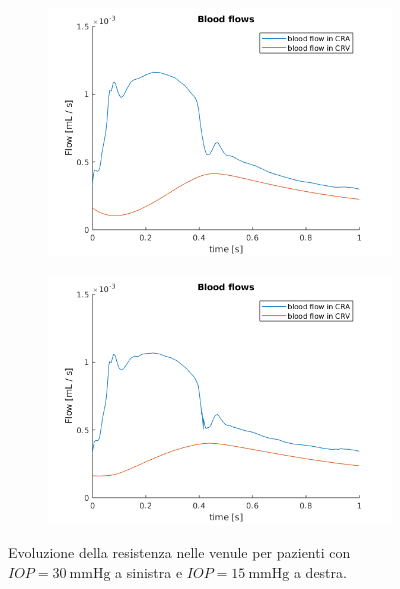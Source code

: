 \documentclass{article}
\begin{document}
\begin{figure}[h]
\begin{subfigure}{.5\textwidth}
  \centering
  \includegraphics[width=1.0\linewidth]{Pictures/IOP30_part1/BF_30.png}
\end{subfigure}
\begin{subfigure}{.5\textwidth}
  \centering
  \includegraphics[width=1.0\linewidth]{Pictures/IOP15_part1/BF_15.png}
\end{subfigure}
\caption{Evoluzione della resistenza nelle venule per pazienti con $IOP = \SI{30}{\mmHg}$ a sinistra e $IOP = \SI{15}{\mmHg}$ a destra.}
\label{flusso1530}
\end{figure}
\end{document}
